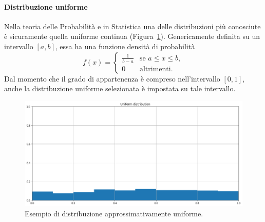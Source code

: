 \documentclass[12pt]{report}
\theoremstyle{definition}
\begin{document}
\paragraph{Distribuzione uniforme}
Nella teoria delle Probabilità e in Statistica una delle distribuzioni più conosciute è sicuramente quella uniforme continua (Figura~\ref{uniforme}). Genericamente definita su un intervallo $[a,b]$, essa ha una funzione densità di probabilità
\begin{equation}
    f(x)= \begin{cases} \frac{1}{b-a} & \mbox{se } a\leq x \leq b, \\ 0 & \mbox{altrimenti.} \end{cases}
\end{equation}
Dal momento che il grado di appartenenza è compreso nell'intervallo $[0,1]$, anche la distribuzione uniforme selezionata è impostata su tale intervallo. 
\begin{figure}
    \centering
    \includegraphics[scale=0.4]{images/uniform.png}
    \caption{Esempio di distribuzione approssimativamente uniforme.}
    \label{uniforme}
\end{figure}
\end{document}
